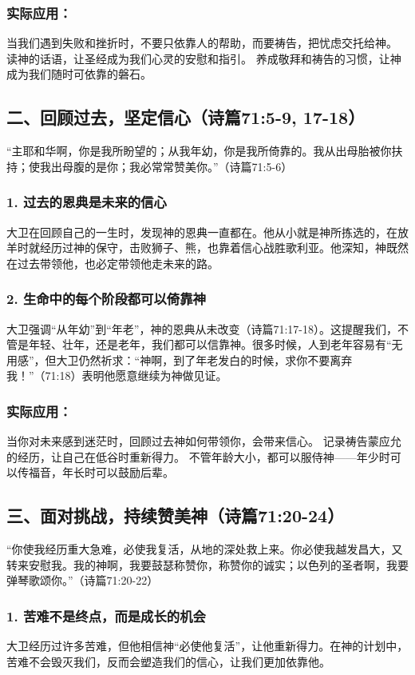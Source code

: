 \documentclass[a4paper, 12pt]{article}
\begin{document}
\subsubsection*{实际应用：}
当我们遇到失败和挫折时，不要只依靠人的帮助，而要祷告，把忧虑交托给神。
读神的话语，让圣经成为我们心灵的安慰和指引。
养成敬拜和祷告的习惯，让神成为我们随时可依靠的磐石。
\subsection*{二、回顾过去，坚定信心（诗篇71:5-9, 17-18）}
“主耶和华啊，你是我所盼望的；从我年幼，你是我所倚靠的。我从出母胎被你扶持；使我出母腹的是你；我必常常赞美你。”（诗篇71:5-6）
\subsubsection*{1. 过去的恩典是未来的信心}
大卫在回顾自己的一生时，发现神的恩典一直都在。他从小就是神所拣选的，在放羊时就经历过神的保守，击败狮子、熊，也靠着信心战胜歌利亚。他深知，神既然在过去带领他，也必定带领他走未来的路。
\subsubsection*{2. 生命中的每个阶段都可以倚靠神}
大卫强调“从年幼”到“年老”，神的恩典从未改变（诗篇71:17-18）。这提醒我们，不管是年轻、壮年，还是老年，我们都可以信靠神。很多时候，人到老年容易有“无用感”，但大卫仍然祈求：“神啊，到了年老发白的时候，求你不要离弃我！”（71:18）表明他愿意继续为神做见证。
\subsubsection*{实际应用：}
当你对未来感到迷茫时，回顾过去神如何带领你，会带来信心。
记录祷告蒙应允的经历，让自己在低谷时重新得力。
不管年龄大小，都可以服侍神——年少时可以传福音，年长时可以鼓励后辈。
\subsection*{三、面对挑战，持续赞美神（诗篇71:20-24）}
“你使我经历重大急难，必使我复活，从地的深处救上来。你必使我越发昌大，又转来安慰我。我的神啊，我要鼓瑟称赞你，称赞你的诚实；以色列的圣者啊，我要弹琴歌颂你。”（诗篇71:20-22）
\subsubsection*{1. 苦难不是终点，而是成长的机会}
大卫经历过许多苦难，但他相信神“必使他复活”，让他重新得力。在神的计划中，苦难不会毁灭我们，反而会塑造我们的信心，让我们更加依靠他。
\end{document}
